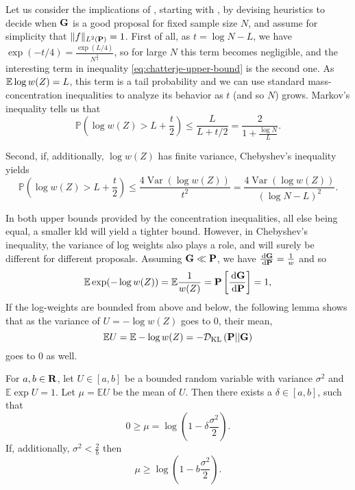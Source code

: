 Let us consider the implications of , starting with , by devising heuristics to decide when $\G$ is a good proposal for fixed sample size $N$, and assume for simplicity that $ \lVert f \rVert_{L^{2}(\P)} = 1 $.
First of all, as $t = \log N - L$, we have $\exp(- t / 4) =  \frac{\exp (L / 4)}{N^{\tfrac{1}{4}}}$, so for large $N$ this term becomes negligible, and the interesting term in inequality \eqref{eq:chatterje-upper-bound} is the second one. As $\E \log w(Z) = L$, this term is a tail probability and we can use standard mass-concentration inequalities to analyze its behavior as $t$ (and so $N$) grows. Markov's inequality tells us that 
$$
\mathbb P \left( \log w(Z) > L + \frac{t}{2} \right) \leq \frac{L}{L + t / 2} = \frac{2}{1 + \frac{\log N}{L}}.
$$

Second, if, additionally, $\log w(Z)$ has finite variance, Chebyshev's inequality yields 
$$
\mathbb P \left( \log w (Z) > L + \frac{t}{2} \right) \leq \frac{4\operatorname{Var} (\log w(Z))}{t^{2}} = \frac{4\operatorname{Var} (\log w(Z))}{\left( \log N - L \right)^2}.
$$

In both upper bounds provided by the concentration inequalities, all else being equal, a smaller \acrshort{kld} will yield a tighter bound. However, in Chebyshev's inequality, the variance of log weights also plays a role, and will surely be different for different proposals.
Assuming $\G \ll \P$, we have $ \frac{\d \G}{\d\P} = \frac{1}{w}$ and so 
$$\mathbb E \exp (- \log w(Z) ) = \mathbb E \frac{1}{w(Z)} = \P \left[\frac{\d \G}{\d\P}\right] = 1,$$
If the log-weights are bounded from above and below, the following lemma shows that as the variance of $U = -\log w(Z)$ goes to $0$, their mean,
$$
\mathbb E U = \mathbb E - \log w(Z) = -\Dkl{\P}{\G}
$$
goes to $0$ as well.
\begin{lemma}
    \label{lem:bounded-log-variance}
    For $a,b \in \R$, let $U \in [a,b]$ be a bounded random variable with variance $\sigma^{2}$ and $\mathbb E \exp U = 1$. Let $\mu = \mathbb E U$ be the mean of $U$. Then there exists a $\delta \in [a,b]$, such that 
    $$
    0 \geq \mu = \log \left( 1 - \delta \frac{\sigma^{2}}{2} \right).
    $$
    If, additionally, $\sigma^{2} < \frac{2}{b}$ then 
    $$
    \mu \geq \log \left( 1 - b \frac{\sigma^{2}}{2} \right).
    $$
\end{lemma}

